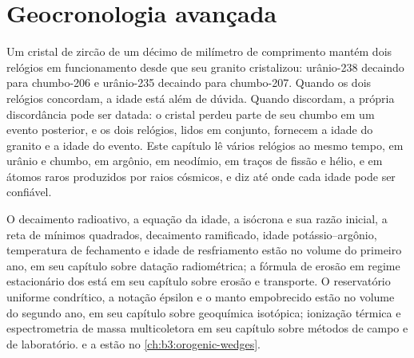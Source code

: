 \chapter{Geocronologia avançada}\label{ch:b3:advanced-geochronology}

Um cristal de zircão de um décimo de milímetro de comprimento mantém dois relógios em funcionamento
desde que seu granito cristalizou: urânio-238 decaindo para chumbo-206 e
urânio-235 decaindo para chumbo-207. Quando os dois relógios concordam, a idade
está além de dúvida. Quando discordam, a própria discordância pode ser datada: o
cristal perdeu parte de seu chumbo em um evento posterior, e os dois relógios, lidos
em conjunto, fornecem a idade do granito e a idade do evento. Este capítulo
lê vários relógios ao mesmo tempo, em urânio e chumbo, em argônio, em neodímio, em
traços de fissão e hélio, e em átomos raros produzidos por raios cósmicos, e diz
até onde cada idade pode ser confiável.

\begin{recall}
O decaimento radioativo, a equação da idade, a isócrona e sua razão inicial, a
reta de mínimos quadrados, decaimento ramificado, idade potássio--argônio, temperatura de
fechamento e idade de resfriamento estão no volume do primeiro ano, em seu capítulo sobre
datação radiométrica; a fórmula de erosão em regime estacionário dos  está em
seu capítulo sobre erosão e transporte. O reservatório uniforme condrítico, a
notação épsilon e o manto empobrecido estão no volume do segundo ano, em seu
capítulo sobre geoquímica isotópica; ionização térmica e espectrometria de massa
multicoletora em seu capítulo sobre métodos de campo e de laboratório.  e
a  estão no \cref{ch:b3:orogenic-wedges}.
\end{recall}

